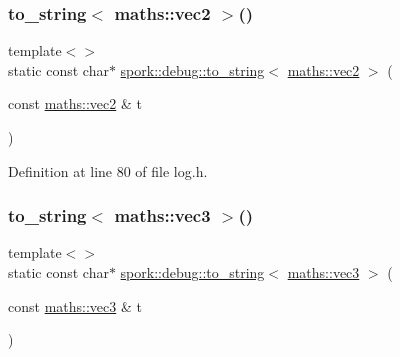 \mbox{\label{namespacespork_1_1debug_a0080d57663b5fdb7cd10a606a2bf719b}} 
\subsubsection{\texorpdfstring{to\+\_\+string$<$ maths\+::vec2 $>$()}{to\_string< maths::vec2 >()}}
{\footnotesize\ttfamily template$<$$>$ \\
static const char$\ast$ \hyperlink{namespacespork_1_1debug_afc2bf363eb52ab11d27418006ad8e210}{spork\+::debug\+::to\+\_\+string}$<$ \hyperlink{structspork_1_1maths_1_1vec2}{maths\+::vec2} $>$ (\begin{DoxyParamCaption}\item[{const \hyperlink{structspork_1_1maths_1_1vec2}{maths\+::vec2} \&}]{t }\end{DoxyParamCaption})\hspace{0.3cm}{\ttfamily [static]}}



Definition at line 80 of file log.\+h.

\mbox{\label{namespacespork_1_1debug_ad9f34051f44d14eb4d3a792ed84c36c8}} 
\subsubsection{\texorpdfstring{to\+\_\+string$<$ maths\+::vec3 $>$()}{to\_string< maths::vec3 >()}}
{\footnotesize\ttfamily template$<$$>$ \\
static const char$\ast$ \hyperlink{namespacespork_1_1debug_afc2bf363eb52ab11d27418006ad8e210}{spork\+::debug\+::to\+\_\+string}$<$ \hyperlink{structspork_1_1maths_1_1vec3}{maths\+::vec3} $>$ (\begin{DoxyParamCaption}\item[{const \hyperlink{structspork_1_1maths_1_1vec3}{maths\+::vec3} \&}]{t }\end{DoxyParamCaption})\hspace{0.3cm}{\ttfamily [static]}}



